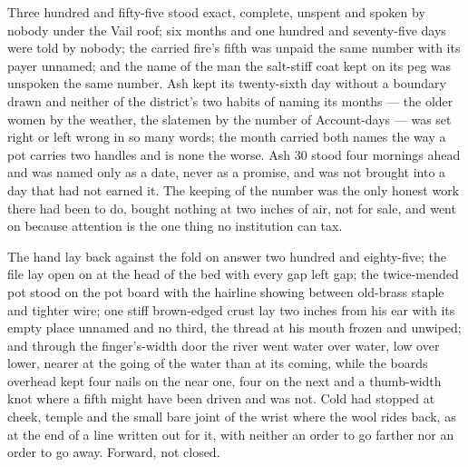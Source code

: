 Three hundred and fifty-five stood exact, complete, unspent and spoken by nobody under the Vail roof; six months and one hundred and seventy-five days were told by nobody; the carried fire's fifth was unpaid the same number with its payer unnamed; and the name of the man the salt-stiff coat kept on its peg was unspoken the same number. Ash kept its twenty-sixth day without a boundary drawn and neither of the district's two habits of naming its months --- the older women by the weather, the slatemen by the number of Account-days --- was set right or left wrong in so many words; the month carried both names the way a pot carries two handles and is none the worse. Ash 30 stood four mornings ahead and was named only as a date, never as a promise, and was not brought into a day that had not earned it. The keeping of the number was the only honest work there had been to do, bought nothing at two inches of air, not for sale, and went on because attention is the one thing no institution can tax.

The hand lay back against the fold on answer two hundred and eighty-five; the file lay open on  at the head of the bed with every gap left gap; the twice-mended pot stood on the pot board with the hairline showing between old-brass staple and tighter wire; one stiff brown-edged crust lay two inches from his ear with its empty place unnamed and no third, the thread at his mouth frozen and unwiped; and through the finger's-width door the river went water over water, low over lower, nearer at the going of the water than at its coming, while the boards overhead kept four nails on the near one, four on the next and a thumb-width knot where a fifth might have been driven and was not. Cold had stopped at cheek, temple and the small bare joint of the wrist where the wool rides back, as at the end of a line written out for it, with neither an order to go farther nor an order to go away. Forward, not closed.
